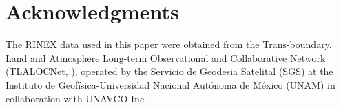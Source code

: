 \documentclass[times,twocolumn,final,authoryear]{elsarticle}
\begin{document}










\section{Acknowledgments}

The RINEX data used in this paper were obtained from the Trans-boundary, Land and Atmosphere Long-term Observational and Collaborative Network (TLALOCNet, \citet{Cabral-Cano:2018}), operated by the Servicio de Geodesia Satelital (SGS) at the Instituto de Geofísica-Universidad Nacional Autónoma de México (UNAM) in collaboration with UNAVCO Inc. 
\end{document}
